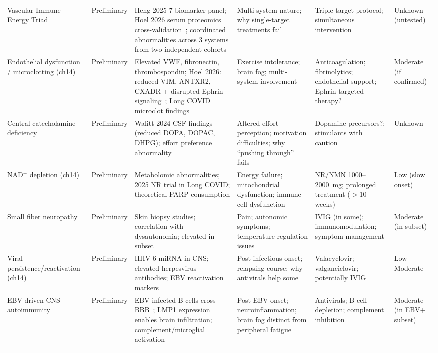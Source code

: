 \begin{landscape}
\begin{longtable}{p{2.8cm}p{1.8cm}p{4.3cm}p{4.3cm}p{3.9cm}p{2.2cm}}
Vascular-Immune-Energy Triad & Preliminary & Heng 2025 7-bio\-marker panel; Hoel 2026 serum pro\-teomics cross-vali\-dation~\cite{Hoel2026proteome}; coordinated abnor\-malities across 3 systems from two independent cohorts & Multi-system nature; why single-target treatments fail & Triple-target protocol; simul\-taneous inter\-vention & Unknown (untested) \\
\addlinespace

Endo\-thelial dys\-function / micro\-clotting (ch14) & Preliminary & Elevated VWF, fibro\-nectin, thrombo\-spondin; Hoel 2026: reduced VIM, ANTXR2, CXADR + disrupted Ephrin signaling~\cite{Hoel2026proteome}; Long COVID micro\-clot findings & Exercise intol\-erance; brain fog; multi-system involve\-ment & Anti\-coagu\-lation; fibrin\-olytics; endo\-thelial support; Ephrin-targeted therapy? & Moderate (if confirmed) \\
\addlinespace

Central cate\-chol\-amine deficiency & Preliminary & Walitt 2024 CSF findings (reduced DOPA, DOPAC, DHPG); effort prefer\-ence abnor\-mality & Altered effort per\-ception; moti\-vation diffi\-culties; why ``pushing through'' fails & Dopa\-mine pre\-cursors?; stimu\-lants with caution & Unknown \\
\addlinespace

NAD$^+$ depletion (ch14) & Preliminary & Meta\-bolomic abnor\-malities; 2025 NR trial in Long COVID; theo\-retical PARP con\-sumption & Energy failure; mito\-chon\-drial dys\-function; immune cell dys\-function & NR/\allowbreak NMN 1000--2000~mg; prolonged treatment ($>$10 weeks) & Low (slow onset) \\
\addlinespace

Small fiber neuro\-pathy & Preliminary & Skin biopsy studies; correlation with dys\-auto\-nomia; elevated in subset & Pain; auto\-nomic symptoms; temper\-ature regu\-lation issues & IVIG (in some); immuno\-modu\-lation; symptom manage\-ment & Moderate (in subset) \\
\addlinespace

Viral persist\-ence/\allowbreak re\-acti\-vation (ch14) & Preliminary & HHV-6 miRNA in CNS; elevated herpes\-virus anti\-bodies; EBV re\-acti\-vation markers & Post-infectious onset; relapsing course; why anti\-virals help some & Vala\-cyclo\-vir; val\-ganci\-clovir; potentially IVIG & Low--Moderate \\
\addlinespace

EBV-driven CNS auto\-immunity & Preliminary & EBV-infected B cells cross BBB~\cite{Pless2026ebv_demyelination}; LMP1 expres\-sion enables brain infil\-tration; comple\-ment/\allowbreak micro\-glial acti\-vation & Post-EBV onset; neuro\-inflam\-mation; brain fog distinct from peri\-pheral fatigue & Anti\-virals; B cell depletion; comple\-ment inhi\-bition & Moderate (in EBV+ subset) \\
\addlinespace


\end{longtable}
\end{landscape}
